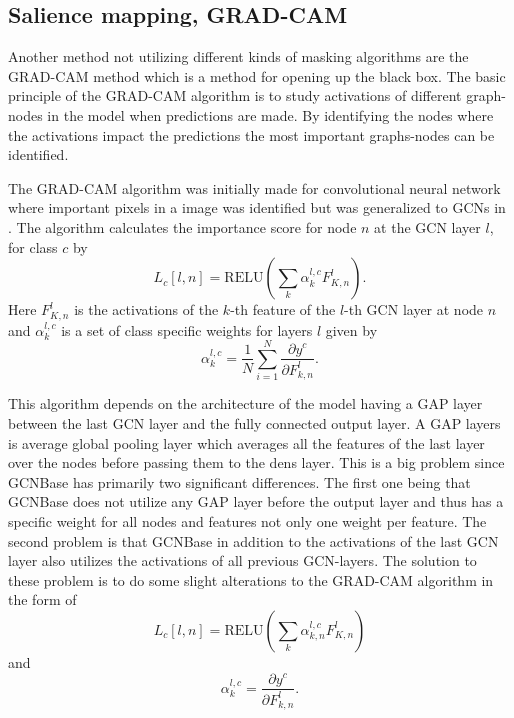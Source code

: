 

\subsection{Salience mapping, GRAD-CAM}
Another method not utilizing different kinds of masking algorithms are the GRAD-CAM method which is a method for opening up the black box. The basic principle of the GRAD-CAM algorithm is to study activations of different graph-nodes in the model when predictions are made. By identifying the nodes where the activations impact the predictions the most important graphs-nodes can be identified. 

The GRAD-CAM algorithm was initially made for convolutional neural network where important pixels in a image was identified \cite{} but was generalized to GCNs in \cite{}. The algorithm calculates the importance score for node $n$ at the GCN layer $l$, for class $c$ by 
\begin{equation*}
    L_c[l,n] =  \text{RELU}(\sum_k \alpha^{l, c}_k F_{K,n}^l). 
\end{equation*}
Here $F_{K,n}^l$ is the activations of the $k$-th feature of the $l$-th GCN layer at node $n$ and $\alpha^{l, c}_k$ is a set of class specific weights for layers $l$ given by 
\begin{equation*}
    \alpha^{l, c}_k = \frac{1}{N}\sum_{i = 1}^N \frac{\partial y^c}{\partial F^l_{k,n}}.
\end{equation*}

This algorithm depends on the architecture of the model having a GAP layer between the last GCN layer and the fully connected output layer. A GAP layers is average global pooling layer which averages all the features of the last layer over the nodes before passing them to the dens layer. This is a big problem since GCNBase has primarily two significant differences. The first one being that GCNBase does not utilize any GAP layer before the output layer and thus has a specific weight for all nodes and features not only one weight per feature. The second problem is that GCNBase in addition to the activations of the last GCN layer also utilizes the activations of all previous GCN-layers. The solution to these problem is to do some slight alterations to the GRAD-CAM algorithm in the form of 
\begin{equation*}
    L_c[l,n] =  \text{RELU}(\sum_k \alpha^{l, c}_{k,n} F_{K,n}^l)
\end{equation*}
and
\begin{equation*}
    \alpha^{l, c}_k = \frac{\partial y^c}{\partial F^l_{k,n}}.
\end{equation*}
